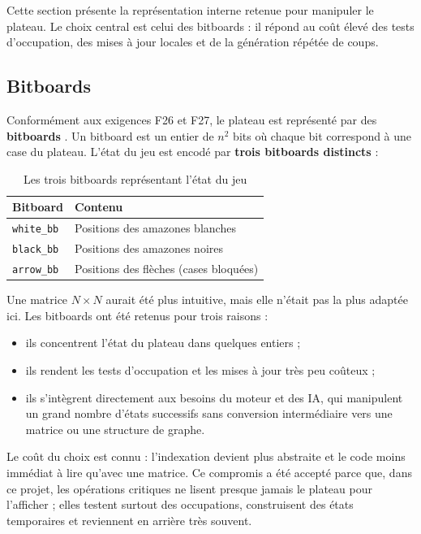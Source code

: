 \documentclass[a4paper]{article}
\providecommand{\toprule}{\hline}
\providecommand{\midrule}{\hline}
\providecommand{\bottomrule}{\hline}
\begin{document}
Cette section présente la représentation interne retenue pour manipuler le plateau. Le choix central est celui des bitboards : il répond au coût élevé des tests d'occupation, des mises à jour locales et de la génération répétée de coups.

\subsection{Bitboards}

Conformément aux exigences F26 et F27, le plateau est représenté par des \textbf{bitboards} \cite{browne2014}. Un bitboard est un entier de $n^2$ bits où chaque bit correspond à une case du plateau. L'état du jeu est encodé par \textbf{trois bitboards distincts} :

\begin{table}[H]
\centering
\begin{tabular}{lp{9cm}}
\toprule
\textbf{Bitboard} & \textbf{Contenu} \\
\midrule
\texttt{white\_bb} & Positions des amazones blanches \\
\texttt{black\_bb} & Positions des amazones noires \\
\texttt{arrow\_bb} & Positions des flèches (cases bloquées) \\
\bottomrule
\end{tabular}
\caption{Les trois bitboards représentant l'état du jeu}
\end{table}

Une matrice $N \times N$ aurait été plus intuitive, mais elle n'était pas la plus adaptée ici. Les bitboards ont été retenus pour trois raisons :
\begin{itemize}
    \item ils concentrent l'état du plateau dans quelques entiers ;
    \item ils rendent les tests d'occupation et les mises à jour très peu coûteux ;
    \item ils s'intègrent directement aux besoins du moteur et des IA, qui manipulent un grand nombre d'états successifs sans conversion intermédiaire vers une matrice ou une structure de graphe.
\end{itemize}

Le coût du choix est connu : l'indexation devient plus abstraite et le code moins immédiat à lire qu'avec une matrice. Ce compromis a été accepté parce que, dans ce projet, les opérations critiques ne lisent presque jamais le plateau pour l'afficher ; elles testent surtout des occupations, construisent des états temporaires et reviennent en arrière très souvent.
\end{document}
